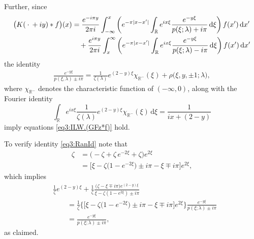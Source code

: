 \documentclass[../dissertation.tex]{subfiles}
\begin{document}
Further, since 
\begin{align*}
	\big(K(\kern 0.5ex \cdot \kern 0.5ex + iy) * f\big)(x)
		&= 
			\frac{e^{-i \pi y}}{2 \pi i} 
				\int_{-\infty}^x 
					\left(
						e^{-\pi |x - x'|} 
						\int_{\mathbb R}
							e^{ix\xi} \frac{e^{-y\xi}}{p(\xi;\lambda) + i\pi}
						\, \mathrm{d}\xi
					\right)
				f(x')
				\, \mathrm{d}x' \\
		&\quad+
			\frac{e^{i \pi y}}{2 \pi i} 
				\int_x^{\infty}
					\left(
						e^{-\pi |x - x'|} 
						\int_{\mathbb R}
							e^{ix\xi} \frac{e^{-y\xi}}{p(\xi;\lambda) - i\pi}
						\, \mathrm{d}\xi
					\right)
				f(x')
				\, \mathrm{d}x' \\
\end{align*}
the identity
\begin{align}\label{eq3:RanId}
	\frac{e^{-y \xi}}{p(\xi , \lambda) \pm i \pi} 
		= \frac{1}{\zeta(\lambda)} e^{(2-y)\xi} \chi_{\mathbb R^-}(\xi) 
			+ \rho \big(\xi, y, \pm 1; \lambda\big),
\end{align}
where $\chi_{\mathbb R^-}$ denotes the characteristic function of $(-\infty, 0)$, along with the
Fourier identity
\[
	\int_{\mathbb R} 
		e^{i x \xi} \frac{1}{\zeta(\lambda)} e^{(2-y)\xi} \chi_{\mathbb R^-}(\xi)
	\, \mathrm{d}\xi
	= 
		\frac{1}{ix + (2-y)}
\]
imply equations \eqref{eq3:ILW.(GFz*f)} hold. 


To verify identity \eqref{eq3:RanId} note that 
\begin{align*}
	\zeta 
		&= \big(-\zeta + \zeta \, e^{-2\xi} + \zeta) e^{2\xi} \\
		&= 
			\big[
				\xi - \zeta\big(1-e^{-2\xi}\big) 
				\pm i \pi - \xi \mp i \pi 
			\big]
			e^{2\xi},
\end{align*}
which implies 
\begin{align*}
	&\frac{1}{\zeta} e^{(2-y)\xi} 
			+ \frac{1}{\zeta}
				\frac{
					\big(\zeta - \xi \mp i\pi\big)e^{(2-y)\xi}
				}
				{\xi-\zeta(1-e^{2\xi}) \pm i \pi}  \\
	&\qquad= 
		\frac{1}{\zeta} 
		\Big\{
			\big[
				\xi - \zeta\big(1-e^{-2\xi}\big) 
				\pm i \pi - \xi \mp i \pi 
			\big]
			e^{2\xi}
		\Big\}
		\frac{e^{-y\xi}}{p(\xi; \lambda) \pm i \pi} \\
	&\qquad= \frac{e^{-y\xi}}{p(\xi; \lambda) \pm i \pi},
\end{align*}
as claimed.
\end{document}
